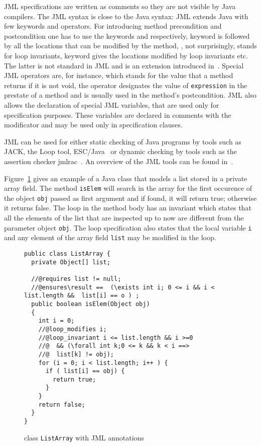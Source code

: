 JML specifications are written as comments so they are not visible by Java compilers. The JML syntax is close to the 
 Java syntax: JML extends Java with few keywords and operators.
 For introducing method precondition and postcondition one has to use the keywords  and  
  respectively,   keyword is followed by all the locations that can be modified by the method, 
  , not surprisingly, stands for loop invariants,  keyword gives the locations modified by loop invariants etc. 
  The latter is not standard in JML and is an extension introduced in~\cite{BRL-JACK}. Special JML operators are, for instance,  which stands for the value that a method returns if it is not void, the  operator 
  designates the value of \texttt{expression} in the prestate of a method and is usually used in the method's postcondition. 
  JML also allows the declaration of special JML variables, that are used only for specification purposes. 
These variables are declared in comments with the  modificator and may be used only in specification clauses. 

JML can be used for either static checking of Java programs by tools such as JACK, the Loop tool, 
ESC/Java~\cite{escjava} or dynamic checking by tools such as the assertion checker jmlrac~\cite{jmlrac}. An overview of the JML tools can 
be found in~\cite{BurdyCCEKLLP03}.
     
Figure~\ref{replaceSrc} gives an example of a Java class that models a list stored in a private array field. 
The method \texttt{isElem} will search in the array for the first occurence of the object \texttt{obj} passed as first argument and if found, it will return true; 
otherwise it returns false. The loop in the method body has an invariant which states that all the elements of the list that are inspected up to now are different from the parameter object \texttt{obj}. The loop specification also states
that the local variable \texttt{i} and any element of the array field \texttt{list} may be modified in the loop.

\begin{figure}[ht!]
\begin{verbatim}
public class ListArray {
  private Object[] list;

  //@requires list != null;
  //@ensures\result ==  (\exists int i; 0 <= i && i < list.length &&  list[i] == o ) ; 
  public boolean isElem(Object obj)
  {
    int i = 0;
    //@loop_modifies i;
    //@loop_invariant i <= list.length && i >=0 
    //@  && (\forall int k;0 <= k && k < i ==> 
    //@  list[k] != obj); 
    for (i = 0; i < list.length; i++ ) {
      if ( list[i] == obj) {
        return true;	
      }
    }
    return false;
  }
}
\end{verbatim}
\caption{class \texttt{ListArray} with JML annotations} 
\label{replaceSrc}
\end{figure}

